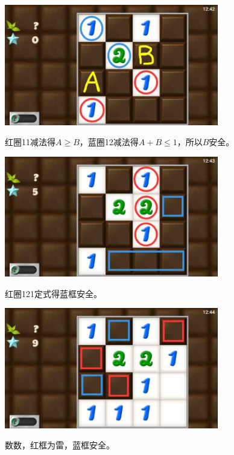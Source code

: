 \subsection{} %
\begin{center}
    \includegraphics[width=0.7\textwidth]{puzzlelow/133-1.jpg}
\end{center}
红圈11减法得$A\ge B$，蓝圈12减法得$A+B\le 1$，所以$B$安全。
\begin{center}
    \includegraphics[width=0.7\textwidth]{puzzlelow/133-2.jpg}
\end{center}
红圈121定式得蓝框安全。
\begin{center}
    \includegraphics[width=0.7\textwidth]{puzzlelow/133-3.jpg}
\end{center}
数数，红框为雷，蓝框安全。

